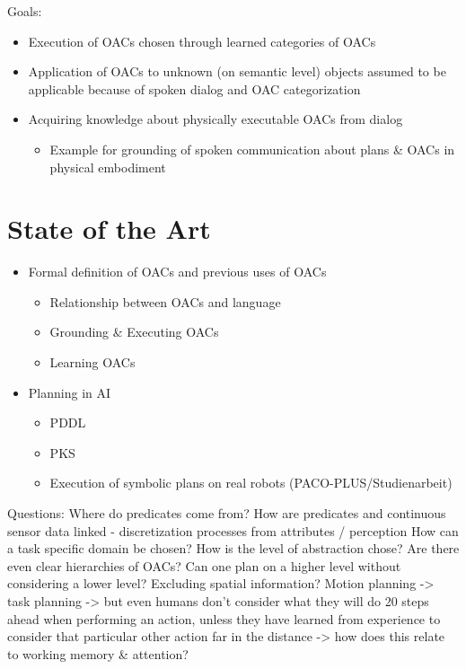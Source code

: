 \documentclass[english,ngerman]{KITreprt}
\begin{document}
Goals:
\begin{itemize}
    \item Execution of OACs chosen through learned categories of OACs
    \item Application of OACs to unknown (on semantic level) objects assumed to be
        applicable because of spoken dialog and OAC categorization
    \item Acquiring knowledge about physically executable OACs from dialog
        \begin{itemize}
            \item Example for grounding of spoken communication about plans \& OACs
                in physical embodiment
        \end{itemize}
\end{itemize}

\chapter{State of the Art}
\begin{itemize}
    \item Formal definition of OACs and previous uses of OACs
        \begin{itemize}
            \item Relationship between OACs and language
            \item Grounding \& Executing OACs
            \item Learning OACs
        \end{itemize}
    \item Planning in AI
        \begin{itemize}
            \item PDDL
            \item PKS
            \item Execution of symbolic plans on real robots (PACO-PLUS/Studienarbeit)
        \end{itemize}
\end{itemize}

Questions:
Where do predicates come from?
How are predicates and continuous sensor data linked
  - discretization processes from attributes / perception
How can a task specific domain be chosen?
How is the level of abstraction chose?
Are there even clear hierarchies of OACs?
Can one plan on a higher level without considering a lower level?
Excluding spatial information? Motion planning -> task planning
-> but even humans don't consider what they will do 20 steps ahead when performing an action, unless they have learned from experience to consider that particular other action far in the distance -> how does this relate to working memory \& attention?
\end{document}
